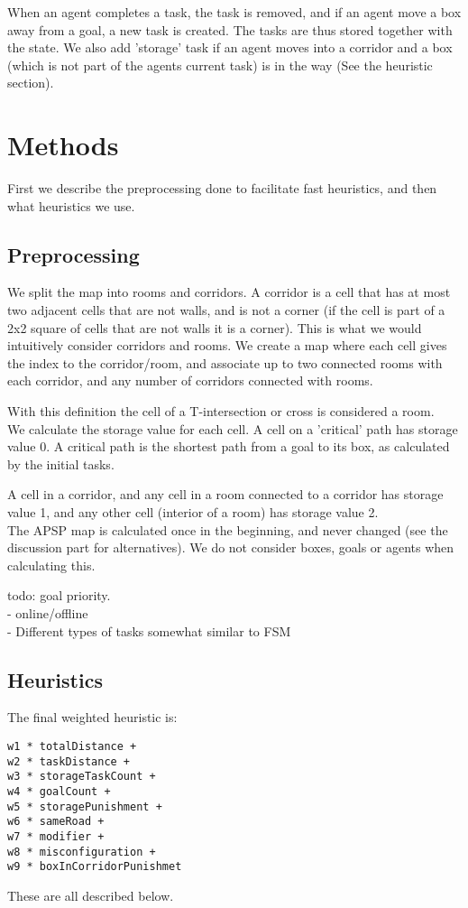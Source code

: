 \documentclass[letterpaper]{article}
\begin{document}
When an agent completes a task, the task is removed, and if an agent move a box away from
a goal, a new task is created. The tasks are thus stored together with the state.
We also add 'storage' task if an agent moves into a corridor and a box (which is not
part of the agents current task) is in the way (See the heuristic section).

\section{Methods}
First we describe the preprocessing done to facilitate fast heuristics, and then
what heuristics we use.

\subsection{Preprocessing}
We split the map into rooms and corridors. A corridor is a cell that has at most
two adjacent cells that are not walls, and is not a corner (if the cell is part of
a 2x2 square of cells that are not walls it is a corner). This is what we would
intuitively consider corridors and rooms. We create a map where each cell gives
the index to the corridor/room, and associate up to two connected rooms with each corridor,
and any number of corridors connected with rooms.

With this definition the cell of a T-intersection or cross is considered a room.\\

We calculate the storage value for each cell. A cell on a 'critical' path has storage
value 0. A critical path is the shortest path from a goal to its box, as calculated
by the initial tasks.

A cell in a corridor, and any cell in a room connected to a corridor has storage
value 1, and any other cell (interior of a room) has storage value 2.\\

The APSP map is calculated once in the beginning, and never changed (see the discussion
part for alternatives). We do not consider boxes, goals or agents when calculating
this.

todo: goal priority.\\

- online/offline\\
- Different types of tasks somewhat similar to FSM\\

\subsection{Heuristics}
The final weighted heuristic is:
\begin{verbatim}
w1 * totalDistance +
w2 * taskDistance +
w3 * storageTaskCount +
w4 * goalCount +
w5 * storagePunishment +
w6 * sameRoad +
w7 * modifier +
w8 * misconfiguration +
w9 * boxInCorridorPunishmet
\end{verbatim}
These are all described below.
\end{document}
